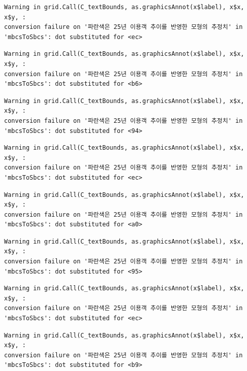 \documentclass[
  letterpaper,
  DIV=11,
  numbers=noendperiod]{scrreprt}
\begin{document}
\begin{verbatim}
Warning in grid.Call(C_textBounds, as.graphicsAnnot(x$label), x$x, x$y, :
conversion failure on '파란색은 25년 이용객 추이를 반영한 모형의 추정치' in
'mbcsToSbcs': dot substituted for <ec>
\end{verbatim}

\begin{verbatim}
Warning in grid.Call(C_textBounds, as.graphicsAnnot(x$label), x$x, x$y, :
conversion failure on '파란색은 25년 이용객 추이를 반영한 모형의 추정치' in
'mbcsToSbcs': dot substituted for <b6>
\end{verbatim}

\begin{verbatim}
Warning in grid.Call(C_textBounds, as.graphicsAnnot(x$label), x$x, x$y, :
conversion failure on '파란색은 25년 이용객 추이를 반영한 모형의 추정치' in
'mbcsToSbcs': dot substituted for <94>
\end{verbatim}

\begin{verbatim}
Warning in grid.Call(C_textBounds, as.graphicsAnnot(x$label), x$x, x$y, :
conversion failure on '파란색은 25년 이용객 추이를 반영한 모형의 추정치' in
'mbcsToSbcs': dot substituted for <ec>
\end{verbatim}

\begin{verbatim}
Warning in grid.Call(C_textBounds, as.graphicsAnnot(x$label), x$x, x$y, :
conversion failure on '파란색은 25년 이용객 추이를 반영한 모형의 추정치' in
'mbcsToSbcs': dot substituted for <a0>
\end{verbatim}

\begin{verbatim}
Warning in grid.Call(C_textBounds, as.graphicsAnnot(x$label), x$x, x$y, :
conversion failure on '파란색은 25년 이용객 추이를 반영한 모형의 추정치' in
'mbcsToSbcs': dot substituted for <95>
\end{verbatim}

\begin{verbatim}
Warning in grid.Call(C_textBounds, as.graphicsAnnot(x$label), x$x, x$y, :
conversion failure on '파란색은 25년 이용객 추이를 반영한 모형의 추정치' in
'mbcsToSbcs': dot substituted for <ec>
\end{verbatim}

\begin{verbatim}
Warning in grid.Call(C_textBounds, as.graphicsAnnot(x$label), x$x, x$y, :
conversion failure on '파란색은 25년 이용객 추이를 반영한 모형의 추정치' in
'mbcsToSbcs': dot substituted for <b9>
\end{verbatim}
\end{document}
